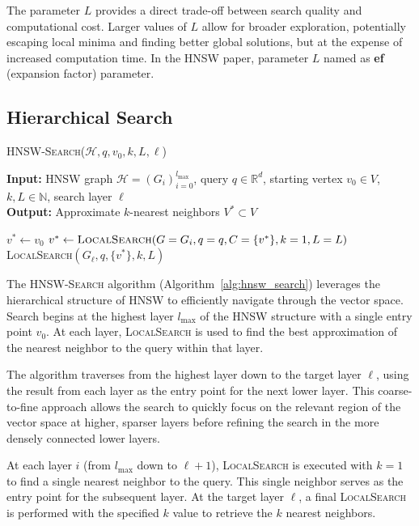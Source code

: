 \documentclass{article}
\begin{document}
The parameter $L$ provides a direct trade-off between search quality and computational cost. Larger values of $L$ allow for broader exploration, potentially escaping local minima and finding better global solutions, but at the expense of increased computation time. In the HNSW paper, parameter $L$ named as \textbf{ef} (expansion factor) parameter.

\subsection{Hierarchical Search}

\begin{algorithm}
\caption{\textsc{HNSW-Search}($\mathcal{H}, q, v_0, k, L, \ell$)}\label{alg:hnsw_search}
\textbf{Input:} HNSW graph $\mathcal{H} = (G_i)_{i=0}^{l_{\max}}$, query $q \in \mathbb{R}^d$, starting vertex $v_0 \in V$, $k, L \in \mathbb{N}$, search layer $\ell$ \\
\textbf{Output:} Approximate $k$-nearest neighbors $V^* \subset V$
\begin{algorithmic}[1]
\State $v^* \gets v_0$ 
    \State $v^* \gets \textsc{LocalSearch}(G=G_i, q=q, C=\{v^*\}, k=1, L=L)$
\EndFor
\State \Return \textsc{LocalSearch}$(G_\ell, q, \{v^*\}, k, L)$
\end{algorithmic}
\end{algorithm}

The \textsc{HNSW-Search} algorithm (Algorithm~\ref{alg:hnsw_search}) leverages the hierarchical structure of HNSW to efficiently navigate through the vector space. Search begins at the highest layer $l_{\max}$ of the HNSW structure with a single entry point $v_0$. At each layer, \textsc{LocalSearch} is used to find the best approximation of the nearest neighbor to the query within that layer.

The algorithm traverses from the highest layer down to the target layer $\ell$, using the result from each layer as the entry point for the next lower layer. This coarse-to-fine approach allows the search to quickly focus on the relevant region of the vector space at higher, sparser layers before refining the search in the more densely connected lower layers.

At each layer $i$ (from $l_{\max}$ down to $\ell+1$), \textsc{LocalSearch} is executed with $k=1$ to find a single nearest neighbor to the query. This single neighbor serves as the entry point for the subsequent layer. At the target layer $\ell$, a final \textsc{LocalSearch} is performed with the specified $k$ value to retrieve the $k$ nearest neighbors.
\end{document}
